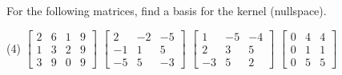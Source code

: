 \begin{exercise}\ansMark%
For the following matrices, find a basis for the kernel (nullspace).
\begin{tasks}(4)
\task
$\begin{bmatrix}
2 & 6 & 1 & 9 \\
1 & 3 & 2 & 9 \\
3 & 9 & 0 & 9
\end{bmatrix}$
\task
$
\begin{bmatrix}
2 & -2 & -5 \\
-1 & 1 & 5 \\
-5 & 5 & -3
\end{bmatrix}$
\task
$
\begin{bmatrix}
1 & -5 & -4 \\
2 & 3 & 5 \\
-3 & 5 & 2
\end{bmatrix}$
\task
$
\begin{bmatrix}
0 & 4 & 4 \\
0 & 1 & 1 \\
0 & 5 & 5
\end{bmatrix}$
\end{tasks}
\end{exercise}

